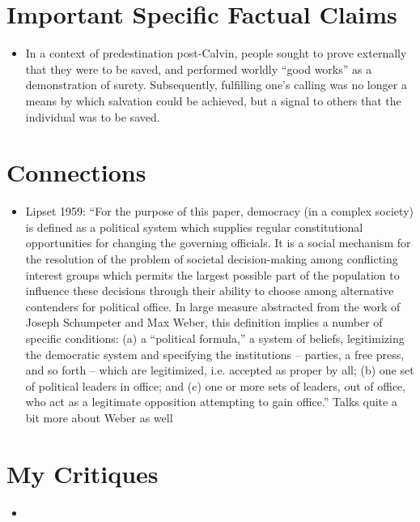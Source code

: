 \documentclass[12pt]{article}
\begin{document}
\section{Important Specific Factual Claims}

\begin{itemize}[leftmargin=*, itemsep=4pt]
    \item In a context of predestination post-Calvin, people sought to prove externally that they were to be saved, and performed worldly ``good works'' as a demonstration of surety. Subsequently, fulfilling one's calling was no longer a means by which salvation could be achieved, but a signal to others that the individual was to be saved.
\end{itemize}

\section{Connections}

\begin{itemize}
    \item Lipset 1959: ``For the purpose of this paper, democracy (in a complex society) is defined as a political system which supplies regular constitutional opportunities for changing the governing officials. It is a social mechanism for the resolution of the problem of societal decision-making among conflicting interest groups which permits the largest possible part of the population to influence these decisions through their ability to choose among alternative contenders for political office. In large measure abstracted from the work of Joseph Schumpeter and Max Weber, this definition implies a number of specific conditions: (a) a ``political formula,'' a system of beliefs, legitimizing the democratic system and specifying the institutions -- parties, a free press, and so forth -- which are legitimized, i.e. accepted as proper by all; (b) one set of political leaders in office; and (c) one or more sets of leaders, out of office, who act as a legitimate opposition attempting to gain office.'' Talks quite a bit more about Weber as well
\end{itemize}

\section{My Critiques}

\begin{itemize}
    \item
\end{itemize}
\end{document}

